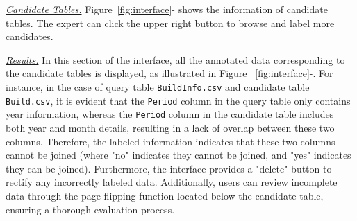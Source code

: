 \noindent \underline{\textit{Candidate Tables.}} %
Figure~\ref{fig:interface}- shows the information of candidate tables. The expert can click the  upper right button to browse and label more candidates. 



\noindent \underline{\textit{Results.}} In this section of the interface, all the annotated data corresponding to the candidate tables is displayed, as illustrated in Figure ~\ref{fig:interface}-. For instance, in the case of query table \texttt{BuildInfo.csv} and candidate table \texttt{Build.csv}, it is evident that the \texttt{Period} column in the query table only contains year information, whereas the \texttt{Period} column in the candidate table includes both year and month details, resulting in a lack of overlap between these two columns. Therefore, the labeled information indicates that these two columns cannot be joined (where "no" indicates they cannot be joined, and "yes" indicates they can be joined).
Furthermore, the interface provides a "delete" button to rectify any incorrectly labeled data. Additionally, users can review incomplete data through the page flipping function located below the candidate table, ensuring a thorough evaluation process.





